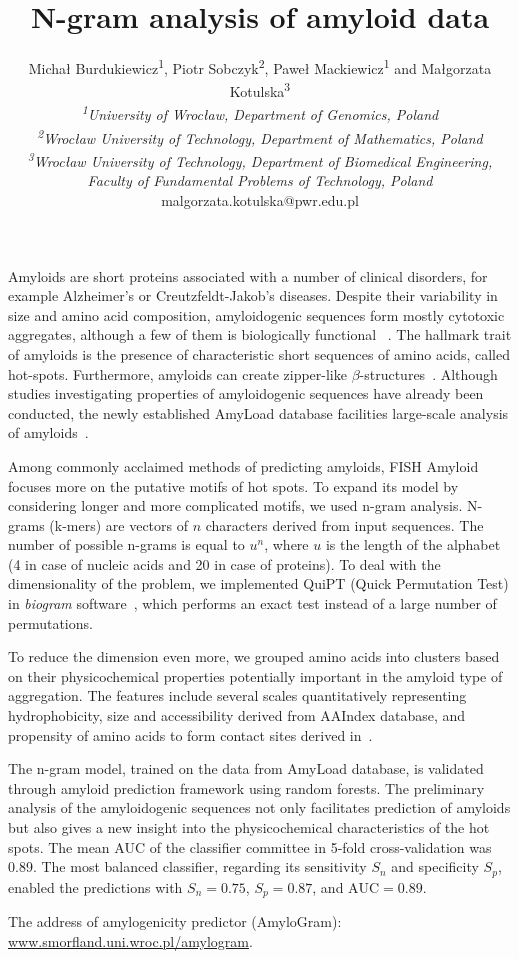 \documentclass[english]{gcb15abstract}
\title{N-gram analysis of amyloid data}
\author{
Micha\l{} Burdukiewicz\textsuperscript{1}, Piotr Sobczyk\textsuperscript{2}, Pawe\l{} Mackiewicz\textsuperscript{1} and Ma\l{}gorzata Kotulska\textsuperscript{3} \\
\small{
{\normalfont\itshape \textsuperscript{1}University of Wroc\l{}aw, Department of Genomics, Poland}\\
{\normalfont\itshape \textsuperscript{2}Wroc\l{}aw University of Technology, Department of Mathematics, Poland}\\
{\normalfont\itshape \textsuperscript{3}Wroc\l{}aw University of Technology, Department of Biomedical Engineering, Faculty of Fundamental Problems of Technology, Poland}\\
malgorzata.kotulska@pwr.edu.pl
}
}
\begin{document}
\maketitle 

Amyloids are short proteins associated with a number of clinical disorders, for example Alzheimer's or Creutzfeldt-Jakob's diseases. Despite their variability in size and amino acid composition, amyloidogenic sequences form mostly cytotoxic aggregates, although a few of them is biologically functional ~\cite{breydo_structural_2015}. The hallmark trait of amyloids is the presence of characteristic short sequences of amino acids, called hot-spots. Furthermore, amyloids can create zipper\mbox{-}\nobreak\hspace{0pt}like $\beta$\mbox{-}\nobreak\hspace{0pt}structures~\cite{fandrich_oligomeric_2012}. Although studies investigating properties of amyloidogenic sequences have already been conducted, the newly established AmyLoad database facilities large-scale analysis of amyloids~\cite{wozniak_amyload:_2015}.

Among commonly acclaimed methods of predicting amyloids, FISH Amyloid~\cite{gasior_fish_2014} focuses more on the putative motifs of hot spots. To expand its model by considering longer and more complicated motifs, we used n-gram analysis. N-grams (k-mers) are vectors of $n$ characters derived from input sequences. The number of possible n-grams is equal to $u^n$, where $u$ is the length of the alphabet (4 in case of nucleic acids and 20 in case of proteins). To deal with the dimensionality of the problem, we implemented QuiPT (Quick Permutation Test) in \textit{biogram} software~\cite{burdukiewicz_biogram:_2015}, which performs an exact test instead of a large number of permutations. 

To reduce the dimension even more, we grouped amino acids into clusters based on their physicochemical properties potentially important in the amyloid type of aggregation. The features include several scales quantitatively representing hydrophobicity, size and accessibility derived from AAIndex database, and propensity of amino acids to form contact sites derived in~\cite{wozniak_characteristics_2014}.

The n-gram model, trained on the data from AmyLoad database, is validated through amyloid prediction framework using random forests. The preliminary analysis of the amyloidogenic sequences not only facilitates prediction of amyloids but also gives a new insight into the physicochemical characteristics of the hot spots. The mean AUC of the classifier committee in 5-fold cross-validation was 0.89. The most balanced classifier, regarding its sensitivity $S_n$ and specificity $S_p$, enabled the predictions with $S_n=0.75$, $S_p=0.87$, and $\textrm{AUC}=0.89$. 

The address of amylogenicity predictor (AmyloGram):  
\url{www.smorfland.uni.wroc.pl/amylogram}.

\scriptsize{

}
\end{document}

